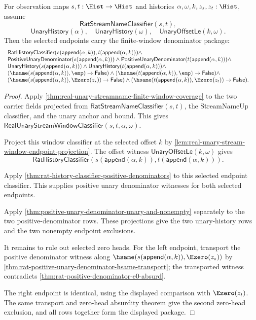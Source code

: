 \begin{theorem}
\label{thm:real-unary-streamname-finite-window-selected-denominator-package}
For observation maps $s,t:\Hist\to\Hist$ and histories
$\alpha,\omega,k,z_s,z_t:\Hist$, assume
$$
\mathsf{RatStreamNameClassifier}(s,t),
$$
$$
\mathsf{UnaryHistory}(\alpha),\quad
\mathsf{UnaryHistory}(\omega),\quad
\mathsf{UnaryOffsetLe}(k,\omega).
$$
Then the selected endpoints carry the finite-window denominator package:
$$
\begin{array}{l}
\mathsf{RatHistoryClassifier}(
s(\mathsf{append}(\alpha,k)),t(\mathsf{append}(\alpha,k)))\land\\
\mathsf{PositiveUnaryDenominator}(s(\mathsf{append}(\alpha,k)))\land
\mathsf{PositiveUnaryDenominator}(t(\mathsf{append}(\alpha,k)))\land\\
\mathsf{UnaryHistory}(s(\mathsf{append}(\alpha,k)))\land
\mathsf{UnaryHistory}(t(\mathsf{append}(\alpha,k)))\land\\
(\hsame(s(\mathsf{append}(\alpha,k)),\emp)\to\mathsf{False})\land
(\hsame(t(\mathsf{append}(\alpha,k)),\emp)\to\mathsf{False})\land\\
(\hsame(s(\mathsf{append}(\alpha,k)),\Ezero(z_s))\to\mathsf{False})\land
(\hsame(t(\mathsf{append}(\alpha,k)),\Ezero(z_t))\to\mathsf{False}).
\end{array}
$$
\end{theorem}
\begin{proof}
Apply \autoref{thm:real-unary-streamname-finite-window-coverage} to the two
carrier fields projected from $\mathsf{RatStreamNameClassifier}(s,t)$, the
StreamNameUp classifier, and the unary anchor and bound. This gives
$\mathsf{RealUnaryStreamWindowClassifier}(s,t,\alpha,\omega)$.

Project this window classifier at the selected offset $k$ by
\autoref{lem:real-unary-stream-window-endpoint-projection}. The offset witness
$\mathsf{UnaryOffsetLe}(k,\omega)$ gives
$$
\mathsf{RatHistoryClassifier}(
s(\mathsf{append}(\alpha,k)),t(\mathsf{append}(\alpha,k))).
$$

Apply \autoref{thm:rat-history-classifier-positive-denominators} to this
selected endpoint classifier. This supplies positive unary denominator witnesses
for both selected endpoints.

Apply \autoref{thm:positive-unary-denominator-unary-and-nonempty} separately to
the two positive-denominator rows. These projections give the two unary-history
rows and the two nonempty endpoint exclusions.

It remains to rule out selected zero heads. For the left endpoint, transport the
positive denominator witness along
$\hsame(s(\mathsf{append}(\alpha,k)),\Ezero(z_s))$ by
\autoref{thm:rat-positive-unary-denominator-hsame-transport}; the transported
witness contradicts \autoref{thm:rat-positive-denominator-e0-absurd}.

The right endpoint is identical, using the displayed comparison with
$\Ezero(z_t)$. The same transport and zero-head absurdity theorem give the
second zero-head exclusion, and all rows together form the displayed package.
\end{proof}
